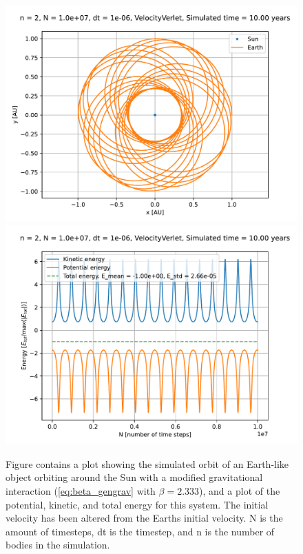 \documentclass[reprint,english,notitlepage]{revtex4-1}  %
\begin{document}
\begin{figure}[H]
\includegraphics[width=\columnwidth]{../data/figures/varyingbeta/se_peturbed_beta233_vv_orbits2D.pdf}
\includegraphics[width=\columnwidth]{../data/figures/varyingbeta/se_peturbed_beta233_vv_energy.pdf}
\caption{Figure contains a plot showing the simulated orbit of an Earth-like object orbiting around the Sun with a modified gravitational interaction (\eqref{eq:beta_gengrav} with $\beta = 2.333$), and a plot of the potential, kinetic, and total energy for this system. The initial velocity has been altered from the Earths initial velocity. N is the amount of timesteps, dt is the timestep, and n is the number of bodies in the simulation.}
\label{fig:beta233_peturbed}
\end{figure}
\end{document}
